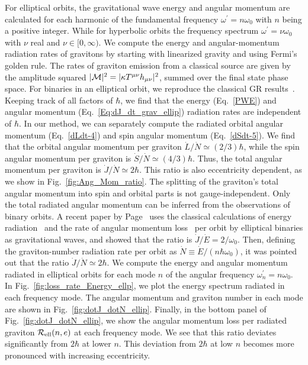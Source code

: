 \documentclass[aps,prd]{revtex4-2}
\begin{document}
For elliptical orbits, the gravitational wave energy and angular momentum are calculated for each harmonic of the fundamental frequency $\omega^{\prime}= n \omega_0$ with $n$ being a positive integer. While for hyperbolic orbits the frequency spectrum $\omega^\prime= \nu \omega_0$  with $\nu$ real and $\nu \in [0, \infty)$. We compute the energy and angular-momentum radiation rates of gravitons by starting with linearized gravity and using Fermi's golden rule. The rates of graviton emission from a classical source are given by the amplitude squared $|{\cal M}|^2=|\kappa T^{\mu \nu} h_{\mu \nu}|^2$, summed over the final state phase space. For binaries in an elliptical orbit, we reproduce the classical GR results~\cite{Peters:1963ux, Peters:1964zz}. Keeping track of all factors of $\hbar$, we find that the energy (Eq.~\eqref{PWE}) and angular momentum  (Eq.~\eqref{Eq:dJ_dt_grav_ellip}) radiation rates are independent of $\hbar$. In our method, we can separately compute the radiated orbital angular momentum (Eq.~\eqref{dLdt-4}) and spin angular momentum (Eq.~\eqref{dSdt-5}). We find that the orbital angular momentum per graviton $\dot{L}/\dot{N} \simeq (2/3) \hbar$, while the spin angular momentum per graviton is $\dot{S}/\dot{N} \simeq (4/3) \hbar$. Thus, the total angular momentum per graviton is $\dot{J}/\dot{N} \simeq 2 \hbar$. This ratio is also eccentricity dependent, as we show in Fig.~\ref{fig:Ang_Mom_ratio}. The splitting of the graviton's total angular momentum into spin and orbital parts is not gauge-independent. Only the total radiated angular momentum can be inferred from the observations of binary orbits. 
A recent paper by Page~\cite{Page:2025ncu} uses the classical calculations of energy radiation~\cite{Peters:1963ux} and the rate of angular momentum loss~\cite{Peters:1963ux} per orbit by elliptical binaries as gravitational waves, and showed that the ratio is $\dot{J}/\dot{E}= 2 /{\omega}_{0}$. Then, defining the graviton-number radiation rate per orbit as $\dot{N} \equiv \dot{E} /(n\hbar \omega_0)$, it was pointed out that the ratio $\dot{J}/\dot{N} \simeq 2 \hbar$. 
We compute the energy and angular momentum radiated in elliptical orbits for each mode $n$ of the angular frequency $\omega^\prime_n= n \omega_0$. In Fig.~\ref{fig:loss_rate_Energy_ellp}, we plot the energy spectrum radiated in each frequency mode. The angular momentum and graviton number in each mode are shown in Fig.~\ref{fig:dotJ_dotN_ellip}. Finally, in the bottom panel of Fig.~\ref{fig:dotJ_dotN_ellip}, we show the angular momentum loss per radiated graviton $\mathcal{R}_{\rm ell} (n, e)$ at each frequency mode. We see that this ratio deviates significantly from $2\hbar$ at lower $n$. This deviation from $2\hbar$ at low $n$ becomes more pronounced with increasing eccentricity.
\end{document}
